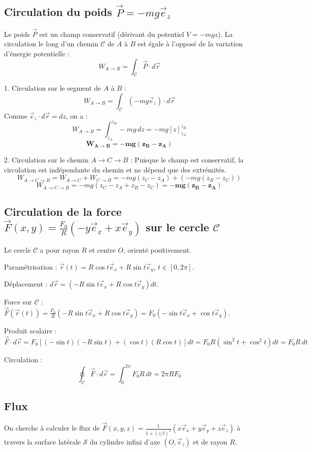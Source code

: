 \documentclass[french]{yLectureNote}
\renewcommand{\vec}{\overrightarrow}
\begin{document}
\subsection{Circulation du poids $\vec{P}=-mg\vec{e}_{z}$}

Le poids $\vec{P}$ est un champ conservatif (dérivant du potentiel $V = -mg z$). La circulation le long d'un chemin $\mathcal{C}$ de $A$ à $B$ est égale à l'opposé de la variation d'énergie potentielle :
$$W_{A \to B} = \int_{\mathcal{C}} \vec{P} \cdot d\vec{r}$$

1.  Circulation sur le segment de $A$ à $B$ :
    $$W_{A \to B} = \int_{\mathcal{C}} (-mg\vec{e}_{z}) \cdot d\vec{r}$$
    Comme $\vec{e}_z \cdot d\vec{r} = dz$, on a :
    $$W_{A \to B} = \int_{z_A}^{z_B} -mg \, dz = -mg [z]_{z_A}^{z_B}$$
    $$\mathbf{W_{A \to B} = -mg(z_{B}-z_{A})}$$

2.  Circulation sur le chemin $A \to C \to B$ :
    Puisque le champ est conservatif, la circulation est indépendante du chemin et ne dépend que des extrémités.
    $$W_{A \to C \to B} = W_{A \to C} + W_{C \to B} = -mg(z_C - z_A) + (-mg(z_B - z_C))$$
    $$W_{A \to C \to B} = -mg(z_C - z_A + z_B - z_C) = \mathbf{-mg(z_{B}-z_{A})}$$

\subsection{Circulation de la force $\vec{F}(x,y)=\frac{F_{0}}{R}(-y\vec{e}_{x}+x\vec{e}_{y})$ sur le cercle $\mathcal{C}$}

Le cercle $\mathcal{C}$ a pour rayon $R$ et centre $O$, orienté positivement.

    Paramétrisation : $\vec{r}(t) = R \cos t \vec{e}_x + R \sin t \vec{e}_y$, $t \in [0, 2\pi]$.

    Déplacement : $d\vec{r} = (-R \sin t \vec{e}_x + R \cos t \vec{e}_y) dt$.

    Force sur $\mathcal{C}$ : $\vec{F}(\vec{r}(t)) = \frac{F_{0}}{R} (-R \sin t \vec{e}_{x} + R \cos t \vec{e}_{y}) = F_{0} (-\sin t \vec{e}_{x} + \cos t \vec{e}_{y})$.

    Produit scalaire :
        $$\vec{F} \cdot d\vec{r} = F_{0} [ (-\sin t)(-R \sin t) + (\cos t)(R \cos t) ] dt = F_{0} R (\sin^{2} t + \cos^{2} t) dt = F_{0} R \, dt$$

    Circulation :
        $$\oint_{\mathcal{C}} \vec{F} \cdot d\vec{r} = \int_{0}^{2\pi} F_{0} R \, dt = 2\pi R F_{0}$$


\subsection{Flux}
On cherche à calculer le flux de $\vec{F}(x,y,z)=\frac{1}{1+(z/l)^{2}}(x\vec{e}_{x}+y\vec{e}_{y}+z\vec{e}_{z})$ à travers la surface latérale $\mathcal{S}$ du cylindre infini d'axe $(O, \vec{e}_z)$ et de rayon $R$.
\end{document}

